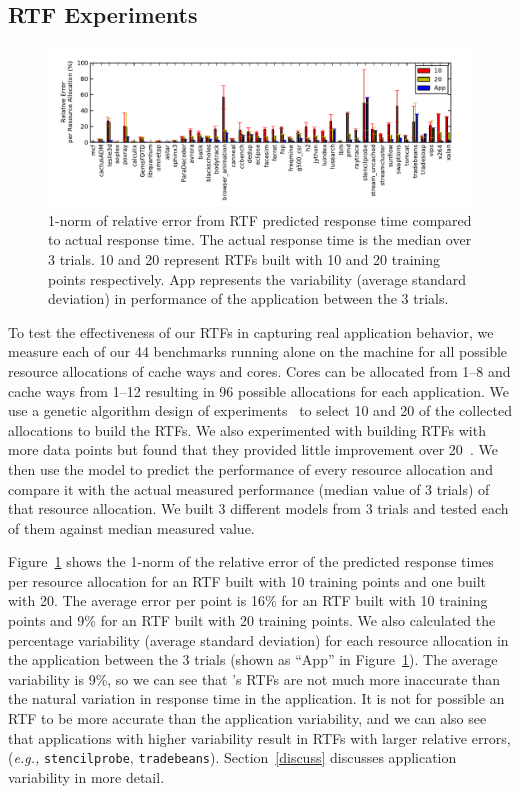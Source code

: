 \subsection{RTF Experiments}
\begin{figure}[!t]
	\begin{center}	
		\includegraphics[bb=0 0 576 216,width=\textwidth]{model_accuracy.pdf}
		\caption{1-norm of relative error from RTF predicted response time compared to actual response time.  The actual response time is the median over 3 trials. 10 and 20 represent RTFs built with 10 and 20 training points respectively.  App represents the variability (average standard deviation) in performance of the application between the 3 trials.}
		\label{model_accuracy}
	\end{center}
\end{figure}
To test the effectiveness of our RTFs in capturing real application behavior, we measure each of our 44 benchmarks running alone on the machine for all possible resource allocations of cache ways and cores.  Cores can be allocated from 1--8 and cache ways from 1--12 resulting in 96 possible allocations for each application.   We use a genetic algorithm design of experiments~\cite{bates-aes03} to select 10 and 20 of the collected allocations to build the RTFs.  We also experimented with building RTFs with more data points but found that they provided little improvement over 20~\cite{pacora_tr}.  We then use the model to predict the performance of every resource allocation and compare it with the actual measured performance (median value of 3 trials) of that resource allocation.  We built 3 different models from 3 trials and tested each of them against median measured value.

Figure~\ref{model_accuracy} shows the 1-norm of the relative error of the predicted response times per resource allocation for an RTF built with 10 training points and one built with 20.  The average error per point is 16\% for an RTF built with 10 training points and 9\% for an RTF built with 20 training points.  We also calculated the percentage variability (average standard deviation) for each resource allocation in the application between the 3 trials (shown as ``App'' in Figure~\ref{model_accuracy}).  The average variability is 9\%, so we can see that \pacora's RTFs are not much more inaccurate than the natural variation in response time in the application.  It is not for possible an RTF to be more accurate than the application variability, and we can also see that applications with higher variability result in RTFs with larger relative errors, (\emph{e.g.,} {\tt stencilprobe}, {\tt tradebeans}).  Section~\ref{discuss} discusses application variability in more detail.


